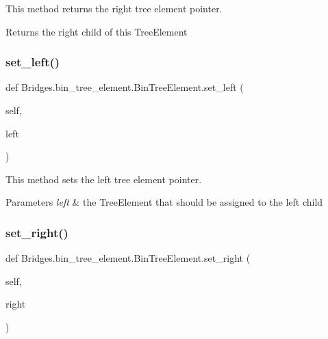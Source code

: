 This method returns the right tree element pointer. 

\begin{DoxyReturn}{Returns}
the right child of this Tree\+Element 
\end{DoxyReturn}
\mbox{\label{class_bridges_1_1bin__tree__element_1_1_bin_tree_element_a4a86199c8090bcd7e603bccea2b5edff}} 
\subsubsection{\texorpdfstring{set\+\_\+left()}{set\_left()}}
{\footnotesize\ttfamily def Bridges.\+bin\+\_\+tree\+\_\+element.\+Bin\+Tree\+Element.\+set\+\_\+left (\begin{DoxyParamCaption}\item[{}]{self,  }\item[{}]{left }\end{DoxyParamCaption})}



This method sets the left tree element pointer. 


\begin{DoxyParams}{Parameters}
{\em left} & the Tree\+Element that should be assigned to the left child \\
\hline
\end{DoxyParams}
\mbox{\label{class_bridges_1_1bin__tree__element_1_1_bin_tree_element_a171c46c251828f265ea8fb60b396f5b7}} 
\subsubsection{\texorpdfstring{set\+\_\+right()}{set\_right()}}
{\footnotesize\ttfamily def Bridges.\+bin\+\_\+tree\+\_\+element.\+Bin\+Tree\+Element.\+set\+\_\+right (\begin{DoxyParamCaption}\item[{}]{self,  }\item[{}]{right }\end{DoxyParamCaption})}



